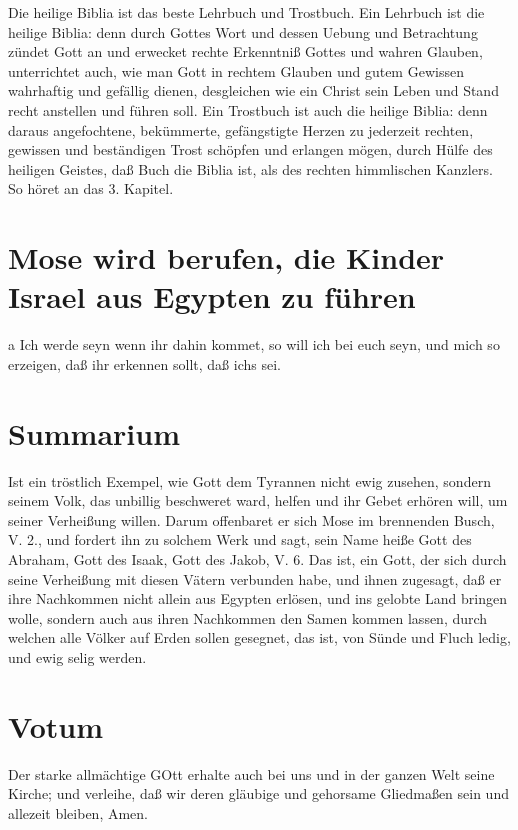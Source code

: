 Die heilige Biblia ist das beste Lehrbuch und Trostbuch. Ein Lehrbuch ist die heilige Biblia: denn durch Gottes Wort und dessen Uebung und Betrachtung zündet Gott an und erwecket rechte Erkenntniß Gottes und wahren Glauben, unterrichtet auch, wie man Gott in rechtem Glauben und gutem Gewissen wahrhaftig und gefällig dienen, desgleichen wie ein Christ sein Leben und Stand recht anstellen und führen soll. Ein Trostbuch ist auch die heilige Biblia: denn daraus angefochtene, bekümmerte, gefängstigte Herzen zu jederzeit rechten, gewissen und beständigen Trost schöpfen und erlangen mögen, durch Hülfe des heiligen Geistes, daß Buch die Biblia ist, als des rechten himmlischen Kanzlers. So höret an das 3. Kapitel.

\section[Mose wird berufen, die Kinder Israel aus Egypten]{Mose wird berufen, die Kinder Israel aus Egypten zu führen}

a Ich werde seyn wenn ihr dahin kommet, so will ich bei euch seyn, und mich so erzeigen, daß ihr erkennen sollt, daß ichs sei.

\section{Summarium}

Ist ein tröstlich Exempel, wie Gott dem Tyrannen nicht ewig zusehen, sondern seinem Volk, das unbillig beschweret ward, helfen und ihr Gebet erhören will, um seiner Verheißung willen. Darum offenbaret er sich Mose im brennenden Busch, V. 2., und fordert ihn zu solchem Werk und sagt, sein Name heiße Gott des Abraham, Gott des Isaak, Gott des Jakob, V. 6. Das ist, ein Gott, der sich durch seine Verheißung mit diesen Vätern verbunden habe, und ihnen zugesagt, daß er ihre Nachkommen nicht allein aus Egypten erlösen, und ins gelobte Land bringen wolle, sondern auch aus ihren Nachkommen den Samen kommen lassen, durch welchen alle Völker auf Erden sollen gesegnet, das ist, von Sünde und Fluch ledig, und ewig selig werden.

\section{Votum}

Der starke allmächtige GOtt erhalte auch bei uns und in der ganzen Welt seine Kirche; und verleihe, daß wir deren gläubige und gehorsame Gliedmaßen sein und allezeit bleiben, Amen.

